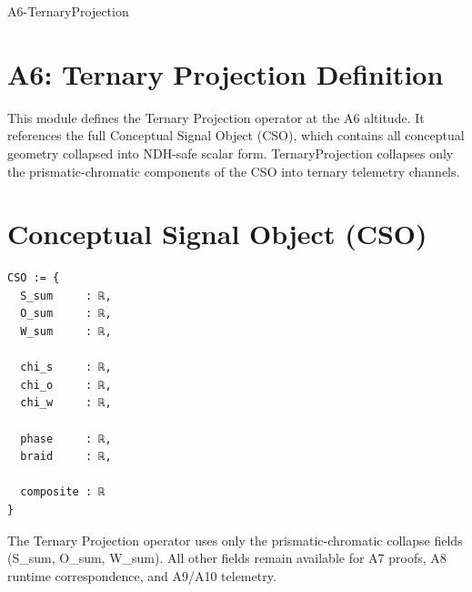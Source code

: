 \documentclass[11pt]{article}
\begin{document}


\begin{citationmembrane}{A6-TernaryProjection}
\end{citationmembrane}

\section*{A6: Ternary Projection Definition}

This module defines the Ternary Projection operator at the A6 altitude.  
It references the full Conceptual Signal Object (CSO), which contains all
conceptual geometry collapsed into NDH-safe scalar form.  
TernaryProjection collapses only the prismatic-chromatic components of the CSO
into ternary telemetry channels.

\newpage


\section{Conceptual Signal Object (CSO)}

\begin{verbatim}
CSO := {
  S_sum     : ℝ,
  O_sum     : ℝ,
  W_sum     : ℝ,

  chi_s     : ℝ,
  chi_o     : ℝ,
  chi_w     : ℝ,

  phase     : ℝ,
  braid     : ℝ,

  composite : ℝ
}
\end{verbatim}

The Ternary Projection operator uses only the prismatic-chromatic collapse
fields (S_sum, O_sum, W_sum). All other fields remain available for A7 proofs,
A8 runtime correspondence, and A9/A10 telemetry.

\newpage

\end{document}
